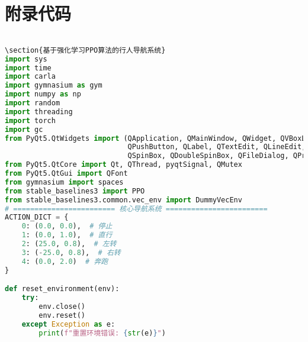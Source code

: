 \chapter{附录代码}

\begin{lstlisting}[language=Python]

\section{基于强化学习PPO算法的行人导航系统}
import sys
import time
import carla
import gymnasium as gym
import numpy as np
import random
import threading
import torch
import gc
from PyQt5.QtWidgets import (QApplication, QMainWindow, QWidget, QVBoxLayout, QHBoxLayout,
                             QPushButton, QLabel, QTextEdit, QLineEdit, QGroupBox,
                             QSpinBox, QDoubleSpinBox, QFileDialog, QProgressBar, QMessageBox)
from PyQt5.QtCore import Qt, QThread, pyqtSignal, QMutex
from PyQt5.QtGui import QFont
from gymnasium import spaces
from stable_baselines3 import PPO
from stable_baselines3.common.vec_env import DummyVecEnv
# ======================== 核心导航系统 ========================
ACTION_DICT = {
    0: (0.0, 0.0),  # 停止
    1: (0.0, 1.0),  # 直行
    2: (25.0, 0.8),  # 左转
    3: (-25.0, 0.8),  # 右转
    4: (0.0, 2.0)  # 奔跑
}

def reset_environment(env):
    try:
        env.close()
        env.reset()
    except Exception as e:
        print(f"重置环境错误: {str(e)}")


\end{lstlisting}

